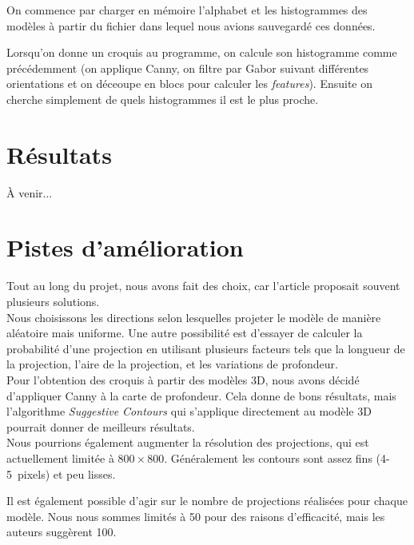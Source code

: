 \documentclass[12pt, a4paper, oneside]{article}
\begin{document}
On commence par charger en mémoire l'alphabet et les histogrammes des modèles à partir du fichier dans lequel nous avions sauvegardé ces données.

Lorsqu'on donne un croquis au programme, on calcule son histogramme comme précédemment (on applique Canny, on filtre par Gabor suivant différentes orientations et on déceoupe en blocs pour calculer les \emph{features}).
Ensuite on cherche simplement de quels histogrammes il est le plus proche.


\section{Résultats}

À venir...

\section{Pistes d'amélioration}

Tout au long du projet, nous avons fait des choix, car l'article proposait souvent plusieurs solutions.\\

Nous choisissons les directions selon lesquelles projeter le modèle de manière aléatoire mais uniforme.
Une autre possibilité est d'essayer de calculer la probabilité d'une projection en utilisant plusieurs facteurs tels que la longueur de la projection, l'aire de la projection, et les variations de profondeur.\\

Pour l'obtention des croquis à partir des modèles 3D, nous avons décidé d'appliquer Canny à la carte de profondeur.
Cela donne de bons résultats, mais l'algorithme \emph{Suggestive Contours} qui s'applique directement au modèle 3D pourrait donner de meilleurs résultats.\\

Nous pourrions également augmenter la résolution des projections, qui est actuellement limitée à $800 \times 800$.
Généralement les contours sont assez fins (4-5~pixels) et peu lisses.

Il est également possible d'agir sur le nombre de projections réalisées pour chaque modèle.
Nous nous sommes limités à 50 pour des raisons d'efficacité, mais les auteurs suggèrent 100.
\end{document}
